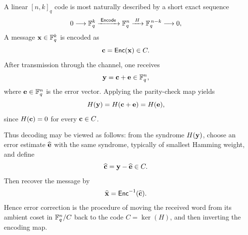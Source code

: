 \newpage
\begin{flushleft}\color{blue}
\begin{note}
	A linear \([n,k]_q\) code is most naturally described by a short exact sequence \[
	0 \longrightarrow \mathbb{F}_q^k \xrightarrow{\;\mathsf{Encode}\;} \mathbb{F}_q^n \xrightarrow{\;H\;} \mathbb{F}_q^{\,n-k} \longrightarrow 0,
	\]
	A message \(\mathbf{x}\in \mathbb{F}_q^k\) is encoded as
	\[
	\mathbf{c}=\mathsf{Enc}(\mathbf{x})\in C.
	\]
	After transmission through the channel, one receives
	\[
	\mathbf{y}=\mathbf{c}+\mathbf{e} \in \mathbb{F}_q^n,
	\]
	where \(\mathbf{e}\in \mathbb{F}_q^n\) is the error vector. Applying the parity-check map yields
	\[
	H(\mathbf{y})=H(\mathbf{c}+\mathbf{e})=H(\mathbf{e}),
	\]
	since \(H(\mathbf{c})=0\) for every \(\mathbf{c}\in C\).
	
	Thus decoding may be viewed as follows: from the syndrome \(H(\mathbf{y})\), choose an error estimate \(\widehat{\mathbf{e}}\) with the same syndrome, typically of smallest Hamming weight, and define
	\[
	\widehat{\mathbf{c}}=\mathbf{y}-\widehat{\mathbf{e}}\in C.
	\]
	Then recover the message by
	\[
	\widehat{\mathbf{x}}=\mathsf{Enc}^{-1}(\widehat{\mathbf{c}}).
	\]
	Hence error correction is the procedure of moving the received word from its ambient coset in \(\mathbb{F}_q^n/C\) back to the code \(C=\ker(H)\), and then inverting the encoding map.
	
\end{note}
\end{flushleft}

